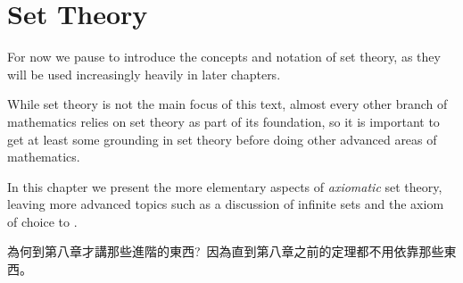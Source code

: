 \chapter{Set Theory} \label{ch3}

For now we pause to introduce the concepts and notation of set theory, as they will be used increasingly heavily in
later chapters.

While set theory is not the main focus of this text, almost every other branch of mathematics relies on set theory as part of its foundation, so it is important to get at least some grounding in set theory before doing other advanced areas of mathematics.

In this chapter we present the more elementary aspects of \emph{axiomatic} set theory, leaving more advanced topics such as a discussion of infinite sets and the axiom of choice to
.

\begin{note}
為何到第八章才講那些進階的東西?\ 因為直到第八章之前的定理都不用依靠那些東西。
\end{note}






